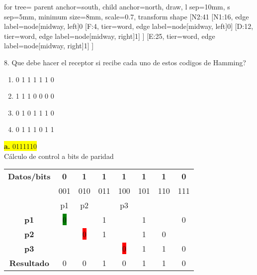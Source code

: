 \documentclass{article}
\begin{document}
	\hfill
	\begin{minipage}{0.32\textwidth}
		\begin{forest}
			for tree={
				parent anchor=south,
				child anchor=north,
				draw,
				l sep=10mm,
				s sep=5mm,
				minimum size=8mm,
				scale=0.7,
				transform shape
			}
			[N2:41
			[N1:16, edge label={node[midway, left]{0}}
			[F:4, tier=word, edge label={node[midway, left]{0}}]
			[D:12, tier=word, edge label={node[midway, right]{1}}]
			]
			[E:25, tier=word, edge label={node[midway, right]{1}}]
			]
		\end{forest}
	\end{minipage}
	\vspace{1.5cm}
	
	8. Que debe hacer el receptor si recibe cada uno de estos codigos de Hamming?
	\begin{enumerate}
	\item 0 1 1 1 1 1 0 
	\item 1 1 1 0 0 0 0 
	\item 0 1 0 1 1 1 0 
	\item 0 1 1 1 0 1 1 
	\end{enumerate}
	\newpage
	\begin{center}
		\hspace{3cm}\colorbox{yellow}{{\textbf{a.} 0111110}}\newline
		\\Cálculo de control a bits de paridad
		
		\begin{table}[h!]
			\centering
			\begin{tabular}{c|ccccccc}
				\toprule
				\textbf{Datos/bits} & \textbf{0} & \textbf{1} & \textbf{1} & \textbf{1} & \textbf{1} & \textbf{1} & \textbf{0}\\ & \scriptsize001 & \scriptsize010 & \scriptsize011 & \scriptsize100 & \scriptsize101 & \scriptsize110 & \scriptsize111\\
				\midrule
				\textbf{} & p1 & p2 & & p3 & & & \\
				\midrule
				\textbf{p1} & \colorbox{green}{0} & & 1 & & 1 & & 0\\
				\midrule
				\textbf{p2} &  & \colorbox{red}{0} & 1 & & 1 & 0  \\
				\midrule
				\textbf{p3} & & & & \colorbox{red}{0} & 1 & 1 & 0 \\
				\midrule
				\textbf{Resultado} & 0 & 0 & 1 & 0 & 1 & 1 & 0\\
				\bottomrule
			\end{tabular}
		\end{table}
	\end{center}
\end{document}
